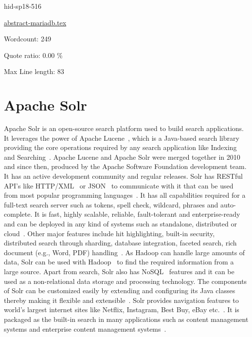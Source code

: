 \begin{IU}

hid-sp18-516

\href{https://github.com/cloudmesh-community/hid-sp18-516/blob/master//technology/abstract-mariadb.tex}{abstract-mariadb.tex}

 

Wordcount: 249


Quote ratio: 0.00 \%
 
Max Line length: 83
\end{IU}

\section{Apache Solr}

Apache Solr is an open-source search platform used
to build search applications. It leverages the power of Apache
Lucene~\cite{hid-sp18-516-www-wiki-lucene}, which is a Java-based 
search library providing the core operations required by any search 
application like Indexing and 
Searching~\cite{hid-sp18-516-www-tutorialspoint-solr}. Apache Lucene and Apache
Solr were merged together in 2010 and since then, produced by the Apache
Software Foundation development team. It has an active development community 
and regular releases. Solr has RESTful API's like 
HTTP/XML~\cite{hid-sp18-516-www-wiki-xml} or 
JSON~\cite{hid-sp18-516-www-wiki-json} to communicate with it that can be used 
from most popular programming languages~\cite{hid-sp18-516-www-wiki-solr}. 
It has all capabilities required for a full-text search server such as tokens, 
spell check, wildcard, phrases and auto-complete. It is fast, highly scalable, 
reliable, fault-tolerant and enterprise-ready and can be deployed in any kind 
of systems such as standalone, distributed or 
cloud~\cite{hid-sp18-516-www-tutorialspoint-solr}. Other major features include 
hit highlighting, built-in security, distributed search through sharding, 
database integration, faceted search, rich document (e.g., Word, PDF)
handling~\cite{hid-sp18-516-www-wiki-solr}. As Hadoop can handle large amounts
of data, Solr can be used with Hadoop~\cite{hid-sp18-516-www-wiki-hadoop} to 
find the required information from a large source. Apart from search, Solr also 
has NoSQL~\cite{hid-sp18-516-www-wiki-nosql} features and it can be used
as a non-relational data storage and processing technology. The components of
Solr can be customized easily by extending and configuring its Java classes
thereby making it flexible and 
extensible~\cite{hid-sp18-516-www-tutorialspoint-solr}. Solr provides navigation
features to world's largest internet sites like Netflix, Instagram, Best Buy,
eBay etc.~\cite{hid-sp18-516-www-apacheorg-solr}. It is packaged as the built-in
search in many applications such as content management systems and enterprise
content management systems~\cite{hid-sp18-516-www-wiki-solr}.


